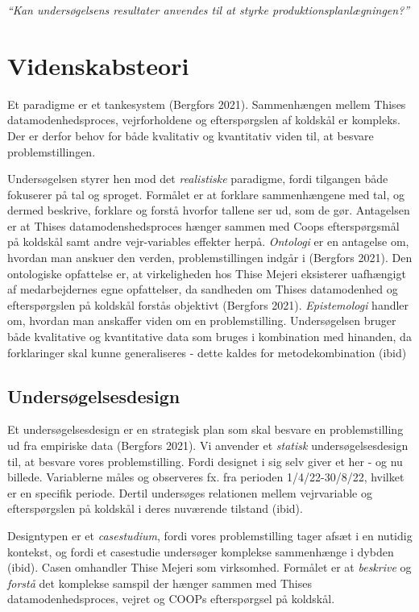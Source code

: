 \documentclass[
  12pt,
  a4paper,
  DIV=11,
  numbers=noendperiod,
  oneside,
  open=any]{scrartcl}
\begin{document}
\emph{``Kan undersøgelsens resultater anvendes til at styrke
produktionsplanlægningen?''}

\hypertarget{videnskabsteori}{%
\section{Videnskabsteori}\label{videnskabsteori}}

Et paradigme er et tankesystem (Bergfors 2021). Sammenhængen mellem
Thises datamodenhedsproces, vejrforholdene og efterspørgslen af koldskål
er kompleks. Der er derfor behov for både kvalitativ og kvantitativ
viden til, at besvare problemstillingen.

Undersøgelsen styrer hen mod det \emph{realistiske} paradigme, fordi
tilgangen både fokuserer på tal og sproget. Formålet er at forklare
sammenhængene med tal, og dermed beskrive, forklare og forstå hvorfor
tallene ser ud, som de gør. Antagelsen er at Thises datamodenshedsproces
hænger sammen med Coops efterspørgsmål på koldskål samt andre
vejr-variables effekter herpå. \emph{Ontologi} er en antagelse om,
hvordan man anskuer den verden, problemstillingen indgår i (Bergfors
2021). Den ontologiske opfattelse er, at virkeligheden hos Thise Mejeri
eksisterer uafhængigt af medarbejdernes egne opfattelser, da sandheden
om Thises datamodenhed og efterspørgslen på koldskål forstås objektivt
(Bergfors 2021). \emph{Epistemologi} handler om, hvordan man anskaffer
viden om en problemstilling. Undersøgelsen bruger både kvalitative og
kvantitative data som bruges i kombination med hinanden, da forklaringer
skal kunne generaliseres - dette kaldes for metodekombination (ibid)

\hypertarget{undersuxf8gelsesdesign}{%
\subsection{Undersøgelsesdesign}\label{undersuxf8gelsesdesign}}

Et undersøgelsesdesign er en strategisk plan som skal besvare en
problemstilling ud fra empiriske data (Bergfors 2021). Vi anvender et
\emph{statisk} undersøgelsesdesign til, at besvare vores
problemstilling. Fordi designet i sig selv giver et her - og nu billede.
Variablerne måles og observeres fx. fra perioden 1/4/22-30/8/22, hvilket
er en specifik periode. Dertil undersøges relationen mellem vejrvariable
og efterspørgslen på koldskål i deres nuværende tilstand (ibid).

Designtypen er et \emph{casestudium}, fordi vores problemstilling tager
afsæt i en nutidig kontekst, og fordi et casestudie undersøger komplekse
sammenhænge i dybden (ibid). Casen omhandler Thise Mejeri som
virksomhed. Formålet er at \emph{beskrive} og \emph{forstå} det
komplekse samspil der hænger sammen med Thises datamodenhedsproces,
vejret og COOPs efterspørgsel på koldskål.
\end{document}
